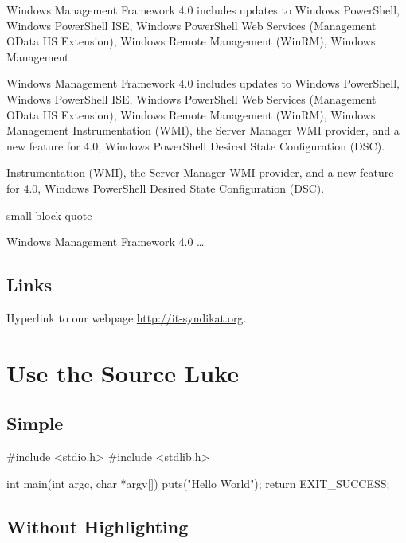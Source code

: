 \documentclass[10pt,a4paper,parskip=half]{scrartcl}
\theoremstyle{plain}
\renewenvironment{quote}
    {\hfill\begin{minipage}{0.95\textwidth}\begin{sidequote}}
    {\end{sidequote}\end{minipage}}
\begin{document}
\begin{quote}
    Windows Management Framework 4.0 includes updates to Windows PowerShell,
    Windows PowerShell ISE, Windows PowerShell Web Services (Management OData
    IIS Extension), Windows Remote Management (WinRM), Windows Management

    \begin{quote}
        Windows Management Framework 4.0 includes updates to Windows PowerShell,
        Windows PowerShell ISE, Windows PowerShell Web Services (Management OData
        IIS Extension), Windows Remote Management (WinRM), Windows Management
        Instrumentation (WMI), the Server Manager WMI provider, and a new feature
        for 4.0, Windows PowerShell Desired State Configuration (DSC).
    \end{quote}

    Instrumentation (WMI), the Server Manager WMI provider, and a new feature
    for 4.0, Windows PowerShell Desired State Configuration (DSC).
\end{quote}

small block quote

\begin{quote}
    Windows Management Framework 4.0 \dots
\end{quote}

\subsection{Links}
\label{sub:links}

Hyperlink to our webpage \url{http://it-syndikat.org}.

\newpage

\section{Use the Source Luke}
\label{sec:use_the_source_luke}

\subsection{Simple}
\label{sub:simple}

\begin{ccode}
#include <stdio.h>
#include <stdlib.h>

int main(int argc, char *argv[]) {
    puts("Hello World");
    return EXIT_SUCCESS;
}
\end{ccode}

\subsection{Without Highlighting}
\label{sub:without_highlighting}
\end{document}
